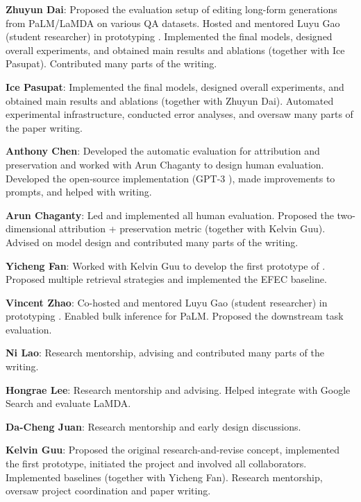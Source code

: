 \documentclass[11pt]{article}
\begin{document}
\textbf{Zhuyun Dai}: Proposed the evaluation setup of editing long-form generations from PaLM/LaMDA on various QA datasets. Hosted and mentored Luyu Gao (student researcher) in prototyping \approach{}. Implemented the final models, designed overall experiments, and obtained main results and ablations (together with Ice Pasupat). Contributed many parts of the writing.

\textbf{Ice Pasupat}: Implemented the final models, designed overall experiments, and obtained main results and ablations (together with Zhuyun Dai). Automated experimental infrastructure, conducted error analyses, and oversaw many parts of the paper writing.

\textbf{Anthony Chen}: Developed the automatic evaluation for attribution and preservation and worked with Arun Chaganty to design human evaluation. Developed the open-source implementation (GPT-3 \approach{}), made improvements to prompts, and helped with writing.

\textbf{Arun Chaganty}: Led and implemented all human evaluation. Proposed the two-dimensional attribution + preservation metric (together with Kelvin Guu). Advised on model design and contributed many parts of the writing.

\textbf{Yicheng Fan}: Worked with Kelvin Guu to develop the first prototype of \approach{}. Proposed multiple retrieval strategies and implemented the EFEC baseline.

\textbf{Vincent Zhao}: Co-hosted and mentored Luyu Gao (student researcher) in prototyping \approach{}. Enabled bulk inference for PaLM. Proposed the downstream task evaluation.

\textbf{Ni Lao}: Research mentorship, advising and contributed many parts of the writing.

\textbf{Hongrae Lee}: Research mentorship and advising. Helped integrate \approach{} with Google Search and evaluate LaMDA.

\textbf{Da-Cheng Juan}: Research mentorship and early design discussions.

\textbf{Kelvin Guu}: Proposed the original research-and-revise concept, implemented the first prototype, initiated the project and involved all collaborators. Implemented baselines (together with Yicheng Fan). Research mentorship, oversaw project coordination and paper writing.





\end{document}
